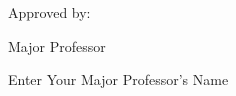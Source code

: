     \begin{flushright}
    Approved by:\\
    \vspace{0.3cm}
    \begin{singlespace}
    Major Professor



    Enter Your Major Professor's Name\\
    \end{singlespace}
    \end{flushright}


